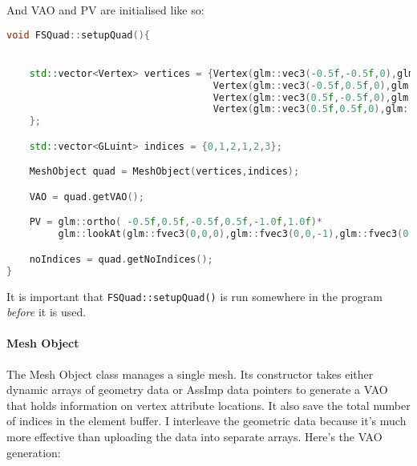 And VAO and PV are initialised like so:
\begin{lstlisting}[caption={MyUtility.cpp},language=c++]
void FSQuad::setupQuad(){


	std::vector<Vertex> vertices = {Vertex(glm::vec3(-0.5f,-0.5f,0),glm::vec3(0,0,-1),glm::vec2(0,0)),
									Vertex(glm::vec3(-0.5f,0.5f,0),glm::vec3(0,0,-1),glm::vec2(0,1)),
									Vertex(glm::vec3(0.5f,-0.5f,0),glm::vec3(0,0,-1),glm::vec2(1,0)),
									Vertex(glm::vec3(0.5f,0.5f,0),glm::vec3(0,0,-1),glm::vec2(1,1))
	};

	std::vector<GLuint> indices = {0,1,2,1,2,3};

	MeshObject quad = MeshObject(vertices,indices);

	VAO = quad.getVAO();

	PV = glm::ortho( -0.5f,0.5f,-0.5f,0.5f,-1.0f,1.0f)*
		 glm::lookAt(glm::fvec3(0,0,0),glm::fvec3(0,0,-1),glm::fvec3(0,1,0));

	noIndices = quad.getNoIndices();
}
\end{lstlisting}
It is important that \verb=FSQuad::setupQuad()= is run somewhere in the program \emph{before} it is used.

\paragraph{Mesh Object}
The Mesh Object class manages a single mesh. Its constructor takes either dynamic arrays of geometry data or AssImp data pointers to generate a VAO that holds information on vertex attribute locations. It also save the total number of indices in the element buffer. I interleave the geometric data because it's much more effective than uploading the data into separate arrays. Here's the VAO generation:

